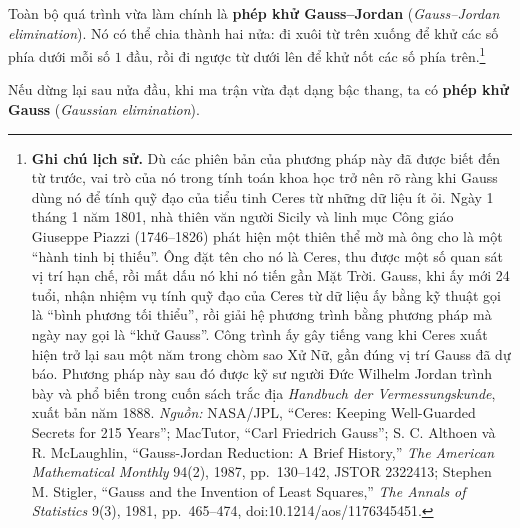 \documentclass[12pt,a4paper]{article}
\begin{document}
Toàn bộ quá trình vừa làm chính là \textbf{phép khử Gauss--Jordan} (\emph{Gauss--Jordan elimination}). Nó có thể chia thành hai nửa: đi xuôi từ trên xuống để khử các số phía dưới mỗi số \(1\) đầu, rồi đi ngược từ dưới lên để khử nốt các số phía trên.\footnote{\textbf{Ghi chú lịch sử.} Dù các phiên bản của phương pháp này đã được biết đến từ trước, vai trò của nó trong tính toán khoa học trở nên rõ ràng khi Gauss dùng nó để tính quỹ đạo của tiểu tinh Ceres từ những dữ liệu ít ỏi. Ngày 1 tháng 1 năm 1801, nhà thiên văn người Sicily và linh mục Công giáo Giuseppe Piazzi (1746--1826) phát hiện một thiên thể mờ mà ông cho là một ``hành tinh bị thiếu''. Ông đặt tên cho nó là Ceres, thu được một số quan sát vị trí hạn chế, rồi mất dấu nó khi nó tiến gần Mặt Trời. Gauss, khi ấy mới 24 tuổi, nhận nhiệm vụ tính quỹ đạo của Ceres từ dữ liệu ấy bằng kỹ thuật gọi là ``bình phương tối thiểu'', rồi giải hệ phương trình bằng phương pháp mà ngày nay gọi là ``khử Gauss''. Công trình ấy gây tiếng vang khi Ceres xuất hiện trở lại sau một năm trong chòm sao Xử Nữ, gần đúng vị trí Gauss đã dự báo. Phương pháp này sau đó được kỹ sư người Đức Wilhelm Jordan trình bày và phổ biến trong cuốn sách trắc địa \emph{Handbuch der Vermessungskunde}, xuất bản năm 1888. \emph{Nguồn:} NASA/JPL, ``Ceres: Keeping Well-Guarded Secrets for 215 Years''; MacTutor, ``Carl Friedrich Gauss''; S. C. Althoen và R. McLaughlin, ``Gauss-Jordan Reduction: A Brief History,'' \emph{The American Mathematical Monthly} 94(2), 1987, pp.~130--142, JSTOR 2322413; Stephen M. Stigler, ``Gauss and the Invention of Least Squares,'' \emph{The Annals of Statistics} 9(3), 1981, pp.~465--474, doi:10.1214/aos/1176345451.}

Nếu dừng lại sau nửa đầu, khi ma trận vừa đạt dạng bậc thang, ta có \textbf{phép khử Gauss} (\emph{Gaussian elimination}).
\end{document}
